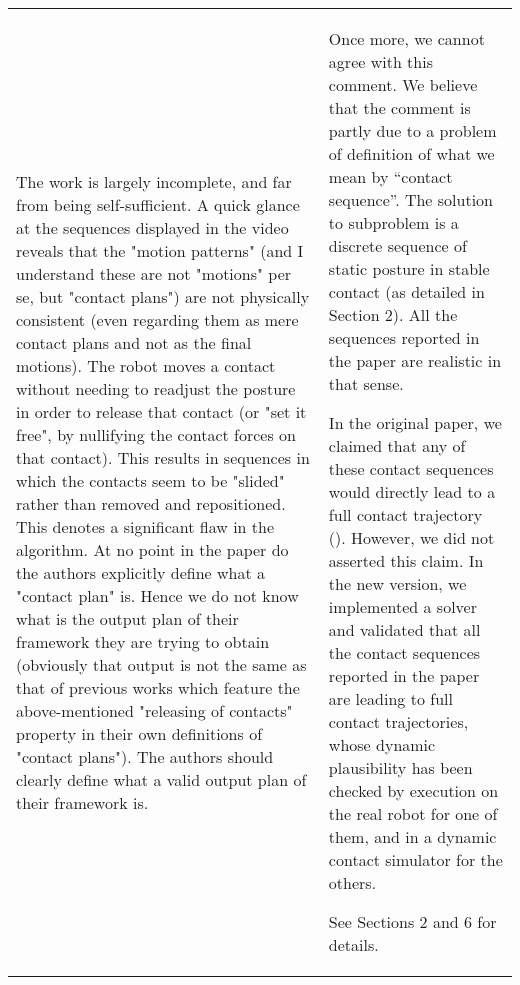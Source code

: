 \documentclass[a4paper]{article}
\begin{document}
\begin{longtable}{|p{21em}|p{21em}|}
\\ \hline %
The work is largely incomplete, and far from being self-sufficient. A quick glance at the sequences displayed in the video reveals that the "motion patterns" (and I understand these are not "motions" per se, but "contact plans") are not physically consistent (even regarding them as mere contact plans and not as the final motions). The robot moves a contact without needing to readjust the posture in order to release that contact (or "set it free", by nullifying the contact forces on that contact). This results in sequences in which the contacts seem to be "slided" rather than removed and repositioned. This denotes a significant flaw in the algorithm. At no point in the paper do the authors explicitly define what a "contact plan" is. Hence we do not know what is the output plan of their framework they are trying to obtain (obviously that output is not the same as that of previous works which feature the above-mentioned "releasing of contacts" property in their own definitions of "contact plans"). The authors should clearly define what a valid output plan of their framework is.
&
Once more, we cannot agree with this comment.
We believe that the comment is partly due to a problem of definition of what we mean by ``contact sequence''.
The solution to subproblem \mP2 is a discrete sequence of static posture in stable contact (as detailed in Section 2).
All the sequences reported in the paper are realistic in that sense.

In the original paper, we claimed that any of these contact sequences would directly lead to a full contact trajectory (\mP3).
However, we did not asserted this claim. 
In the new version, we implemented a solver \mP3 and validated that all the contact sequences reported in the paper are leading to full contact trajectories, whose dynamic plausibility has been checked by execution on the real robot for one of them, and in a dynamic contact simulator for the others.

See Sections 2 and 6 for details.


\end{longtable}
\end{document}
